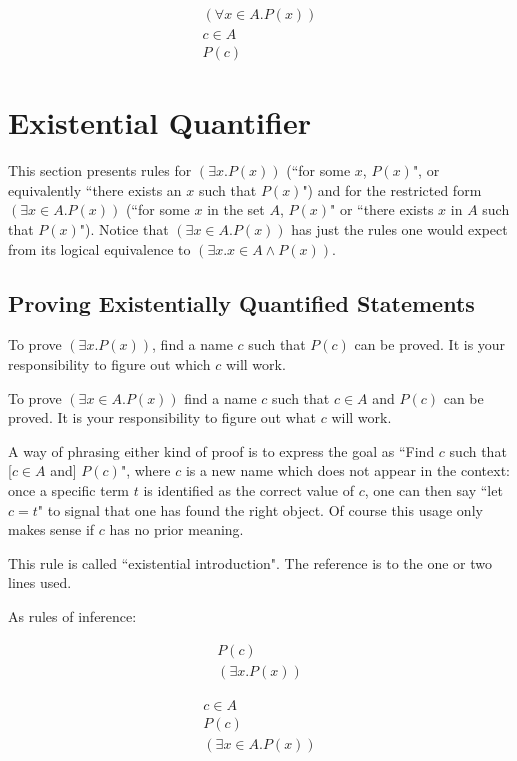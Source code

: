 \documentclass[12pt]{book}
\begin{document}
$$\begin{array}{r} (\forall x\in A.P(x)) \\c \in A \\ \hline P(c) \end{array}$$

\section{Existential Quantifier}
This section presents rules for $(\exists x.P(x))$ (``for some $x$, $P(x)$", or equivalently ``there exists an $x$ such that $P(x)$") and for the restricted form $(\exists x \in A.P(x))$ (``for some $x$ in the set $A$, $P(x)$" or ``there exists $x$ in $A$ such that $P(x)$").  Notice that $(\exists x \in A.P(x))$ has just the rules one would expect from its logical equivalence to $(\exists x.x \in A \wedge P(x))$.

\subsection{Proving Existentially Quantified Statements}

To prove $(\exists x.P(x))$, find a name $c$ such that $P(c)$ can be proved.  It is your responsibility to figure out which $c$ will work.

To prove $(\exists x\in A.P(x))$ find a name $c$ such that $c \in A$ and $P(c)$ can be proved.  It is your responsibility to figure out what $c$ will work.

A way of phrasing either kind of proof is to express the goal as ``Find $c$ such that [$c \in A$ and] $P(c)$", where $c$ is a new name which does not appear in the context:  once a specific term $t$ is identified as the correct value of $c$, one can then say ``let $c = t$" to signal that one has found the right object.  Of course this usage only makes sense if
$c$ has no prior meaning.

This rule is called ``existential introduction".  The reference is to the one or two lines used.

As rules of inference:

$$\begin{array}{r} P(c) \\ \hline (\exists x.P(x))\end{array}$$

$$\begin{array}{r} c \in A \\ P(c) \\ \hline (\exists x \in A.P(x))\end{array}$$
\end{document}
